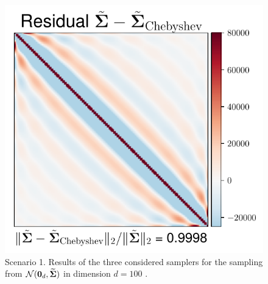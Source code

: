 \documentclass[nohypdvips,onefignum,onetabnum]{siamart171218}
\begin{document}
\begin{figure}
  \mbox{{\includegraphics[scale=0.4]{images/simu1_ex1_invA_Cheby.pdf}}}
\caption{Scenario 1. Results of the three considered samplers for the sampling from $\mathcal{N}(\mathbf{0}_d,\widetilde{\mathbf{\Sigma}})$ in dimension $d = 100$ .}
  \label{fig:simu1_distrib_eigenvalues_2}
\end{figure}
%
\end{document}
